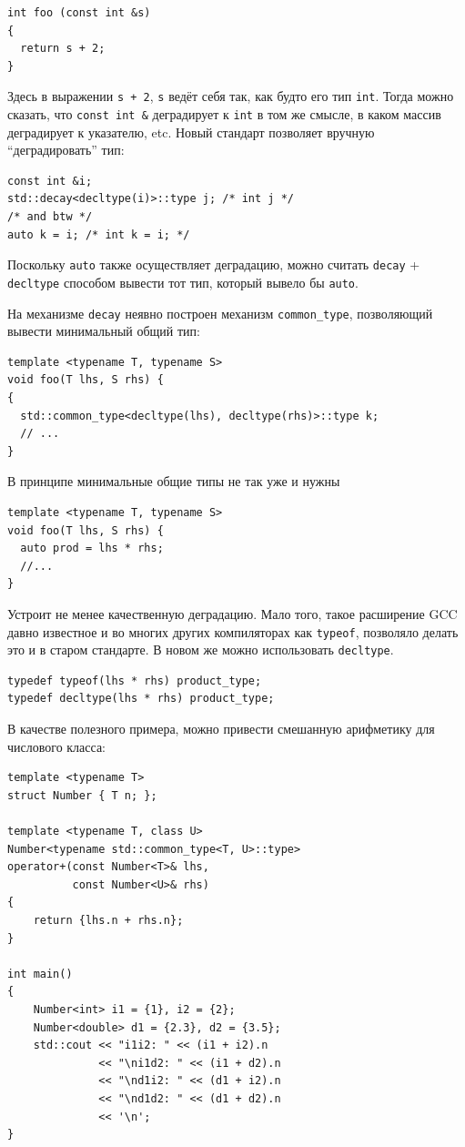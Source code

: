 \documentclass[a4paper,12pt,oneside]{article}
\begin{document}
\begin{lstlisting}
int foo (const int &s)
{
  return s + 2;
}
\end{lstlisting}

Здесь в выражении \lstinline!s + 2!, \lstinline!s! ведёт себя так, как будто его тип \lstinline!int!. Тогда можно сказать, что \lstinline!const int &! деградирует к \lstinline!int! в том же смысле, в каком массив деградирует к указателю, etc. Новый стандарт позволяет вручную ``деградировать'' тип:

\begin{lstlisting}
const int &i;
std::decay<decltype(i)>::type j; /* int j */
/* and btw */
auto k = i; /* int k = i; */
\end{lstlisting}

Поскольку \lstinline!auto! также осуществляет деградацию, можно считать \lstinline!decay! + \lstinline!decltype! способом вывести тот тип, который вывело бы \lstinline!auto!.

На механизме \lstinline!decay! неявно построен механизм \lstinline!common_type!, позволяющий вывести минимальный общий тип:

\begin{lstlisting}
template <typename T, typename S>
void foo(T lhs, S rhs) {
{
  std::common_type<decltype(lhs), decltype(rhs)>::type k;
  // ...
}
\end{lstlisting}

В принципе минимальные общие типы не так уже и нужны

\begin{lstlisting}
template <typename T, typename S>
void foo(T lhs, S rhs) {
  auto prod = lhs * rhs;
  //...
}
\end{lstlisting}

Устроит не менее качественную деградацию. Мало того, такое расширение GCC давно известное и во многих других компиляторах как \lstinline!typeof!, позволяло делать это и в старом стандарте. В новом же можно использовать \lstinline!decltype!.

\begin{lstlisting}
typedef typeof(lhs * rhs) product_type;
typedef decltype(lhs * rhs) product_type;
\end{lstlisting}

В качестве полезного примера, можно привести смешанную арифметику для числового класса:

\begin{lstlisting}
template <typename T>
struct Number { T n; };
 
template <typename T, class U>
Number<typename std::common_type<T, U>::type> 
operator+(const Number<T>& lhs,
          const Number<U>& rhs) 
{
    return {lhs.n + rhs.n};
}
 
int main()
{
    Number<int> i1 = {1}, i2 = {2};
    Number<double> d1 = {2.3}, d2 = {3.5};
    std::cout << "i1i2: " << (i1 + i2).n 
              << "\ni1d2: " << (i1 + d2).n 
              << "\nd1i2: " << (d1 + i2).n 
              << "\nd1d2: " << (d1 + d2).n 
              << '\n';
}
\end{lstlisting}
\end{document}
